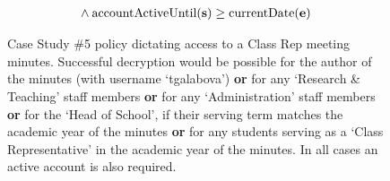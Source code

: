 \begin{figure}[ht]
\begin{align*}
  &
    \phantom{::}\wedge
    \text{accountActiveUntil(\textbf{s})} \geq \text{currentDate(\textbf{e})}
\end{align*}
  \caption{
    \label{fig:case_study_policy_5}
    Case Study \#5 policy dictating access to a Class Rep meeting minutes.
    Successful decryption would be possible for the author of the minutes (with username `tgalabova') \textbf{or} for any `Research \& Teaching' staff members \textbf{or} for any `Administration' staff members \textbf{or} for the `Head of School', if their serving term matches the academic year of the minutes \textbf{or} for any students serving as a `Class Representative' in the academic year of the minutes. In all cases an active account is also required.
  }
\end{figure}

